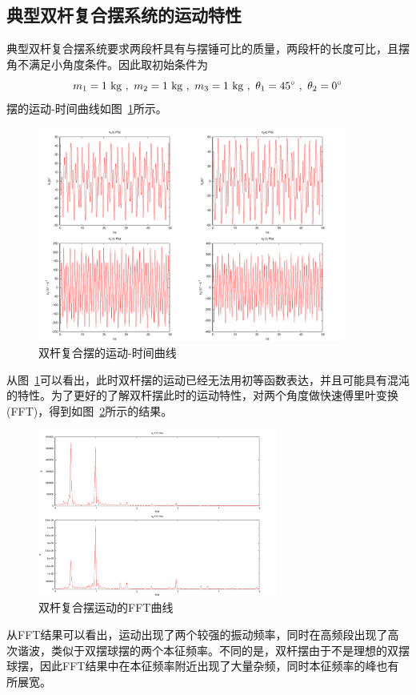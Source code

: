 \documentclass[a4paper,12pt,titlepage]{article}
\begin{document}
\subsection{典型双杆复合摆系统的运动特性}
典型双杆复合摆系统要求两段杆具有与摆锤可比的质量，两段杆的长度可比，且摆角不满足小角度条件。因此取初始条件为
\begin{equation}
	m_1=1~\mathrm{kg} ~,~ m_2=1~\mathrm{kg} ~,~ m_3=1~\mathrm{kg} ~,~ \theta_1=45^{\circ} ~,~ \theta_2=0^{\circ} \notag
\end{equation}
摆的运动-时间曲线如图~\ref{fig:move0}所示。
\begin{figure}[H]
\centering
\includegraphics[width=0.9\textwidth]{./move0.pdf}
\caption[Caption for LOF]{双杆复合摆的运动-时间曲线}
\label{fig:move0}
\end{figure}
从图~\ref{fig:move0}可以看出，此时双杆摆的运动已经无法用初等函数表达，并且可能具有混沌的特性。为了更好的了解双杆摆此时的运动特性，对两个角度做快速傅里叶变换(FFT)，得到如图~\ref{fig:FFT0}所示的结果。
\begin{figure}[H]
\centering
\includegraphics[width=0.7\textwidth]{./FFT0.pdf}
\caption[Caption for LOF]{双杆复合摆运动的FFT曲线}
\label{fig:FFT0}
\end{figure}
从FFT结果可以看出，运动出现了两个较强的振动频率，同时在高频段出现了高次谐波，类似于双摆球摆的两个本征频率。不同的是，双杆摆由于不是理想的双摆球摆，因此FFT结果中在本征频率附近出现了大量杂频，同时本征频率的峰也有所展宽。
\end{document}
